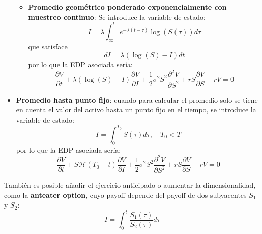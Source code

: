 \begin{itemize}
\begin{itemize}
        \item \textbf{Promedio geométrico ponderado exponencialmente con muestreo continuo}: Se introduce la variable de estado:
        \begin{equation*}
            \boxed{I = \lambda \int_{\infty}^{t} e^{-\lambda (t - \tau)} \log(S(\tau)) d\tau}
        \end{equation*}
        que satisface
        \begin{equation*}
            dI = \lambda (\log(S)-I) dt
        \end{equation*}
        por lo que la EDP asociada sería:
        \begin{equation*}
            \boxed{\frac{\partial V}{\partial t} + \lambda (\log(S)-I) \frac{\partial V}{\partial I}  +  \frac{1}{2} \sigma^2 S^2 \frac{\partial^2 V}{\partial S^2} + r S \frac{\partial V}{\partial S} - rV = 0}
        \end{equation*}
    \end{itemize}

    \item \textbf{Promedio hasta punto fijo}: cuando para calcular el promedio solo se tiene en cuenta el valor del activo hasta un punto fijo en el tiempo, se introduce la variable de estado:
    \begin{equation*}
        \boxed{I = \int_{0}^{T_0} S(\tau) d\tau, \quad T_0 < T}
    \end{equation*}
    por lo que la EDP asociada sería:
    \begin{equation*}
        \boxed{\frac{\partial V}{\partial t} + S \mathcal{H}(T_0-t) \frac{\partial V}{\partial I}  +  \frac{1}{2} \sigma^2 S^2 \frac{\partial^2 V}{\partial S^2} + r S \frac{\partial V}{\partial S} - rV = 0}
    \end{equation*}
\end{itemize}

También es posible añadir el ejercicio anticipado o aumentar la dimensionalidad, como la \textbf{anteater option}, cuyo payoff depende del payoff de dos subyacentes $S_1$ y $S_2$:
\begin{equation*}
    \boxed{I = \int_{0}^{t} \frac{S_1(\tau)}{S_2(\tau)} d\tau}
\end{equation*}






